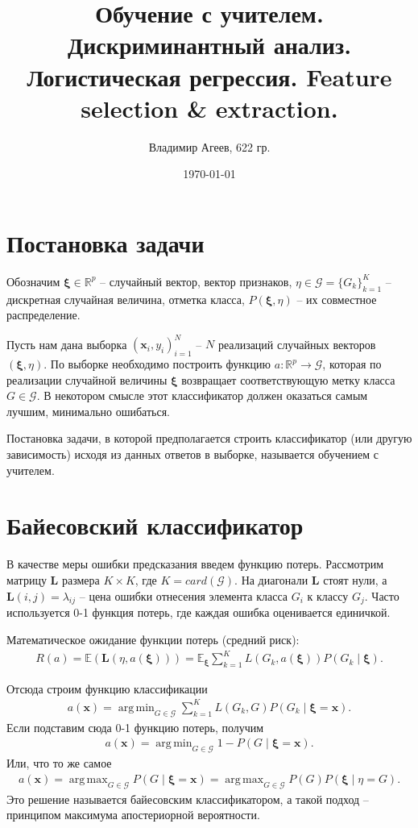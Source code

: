 \documentclass{article}
\title{Обучение с учителем. Дискриминантный анализ. Логистическая регрессия. Feature selection \& extraction.}
\author{Владимир Агеев, 622 гр.}
\date{\today}
\DeclareMathOperator*{\argmin}{arg\,min}
\DeclareMathOperator*{\argmax}{arg\,max}
\begin{document}
\maketitle
\tableofcontents
\section{Постановка задачи}
Обозначим $\boldsymbol{\xi} \in \mathbb{R}^p$ -- случайный вектор, вектор признаков, $\eta \in \mathcal{G} = \{G_k\}_{k = 1}^K$ -- дискретная случайная величина, отметка класса, $P(\boldsymbol{\xi}, \eta)$ -- их совместное распределение.

Пусть нам дана выборка $(\mathbf{x}_i, y_i)_{i = 1}^N$ -- $N$ реализаций случайных векторов $(\boldsymbol{\xi}, \eta)$. По выборке необходимо построить функцию $a: \mathbb{R}^p \rightarrow \mathcal{G}$, которая по реализации случайной величины $\boldsymbol{\xi}$ возвращает соответствующую метку класса $G \in \mathcal{G}$. В некотором смысле этот классификатор должен оказаться самым лучшим, минимально ошибаться.

Постановка задачи, в которой предполагается строить классификатор (или другую зависимость) исходя из данных ответов в выборке, называется обучением с учителем.

\section{Байесовский классификатор}

В качестве меры ошибки предсказания введем функцию потерь. Рассмотрим матрицу $\mathbf{L}$ размера $K \times K$, где $K = card(\mathcal{G})$. На диагонали $\mathbf{L}$ стоят нули, а $\mathbf{L}(i,j) = \lambda_{ij}$ -- цена ошибки отнесения элемента класса $G_i$ к классу $G_j$. Часто используется 0-1 функция потерь, где каждая ошибка оценивается единичкой.

Математическое ожидание функции потерь (средний риск):
\begin{align*}
  R(a) = \mathds{E}(\mathbf{L}(\eta, a(\boldsymbol{\xi}))) = \mathds{E}_{\boldsymbol{\xi}} \sum_{k = 1}^{K} L(G_k, a(\boldsymbol{\xi})) P(G_k \mid \boldsymbol{\xi}).
\end{align*}

Отсюда строим функцию классификации
\begin{align*}
  a(\mathbf{x}) = \argmin_{G \in \mathcal{G}} \sum_{k = 1}^{K} L(G_k, G) P(G_k \mid  \boldsymbol{\xi} = \mathbf{x}).
\end{align*}
Если подставим сюда 0-1 функцию потерь, получим
\begin{align*}
  a(\mathbf{x}) = \argmin_{G \in \mathcal{G}} 1 - P(G \mid \boldsymbol{\xi} = \mathbf{x}).
\end{align*}
Или, что то же самое
\begin{align*}
  a(\mathbf{x}) = \argmax_{G \in \mathcal{G}} P(G \mid \boldsymbol{\xi} = \mathbf{x}) = \argmax_{G \in \mathcal{G}} P(G)P(\boldsymbol{\xi} \mid \eta = G).
\end{align*}
Это решение называется байесовским классификатором, а такой подход -- принципом максимума апостериорной вероятности.
\end{document}
